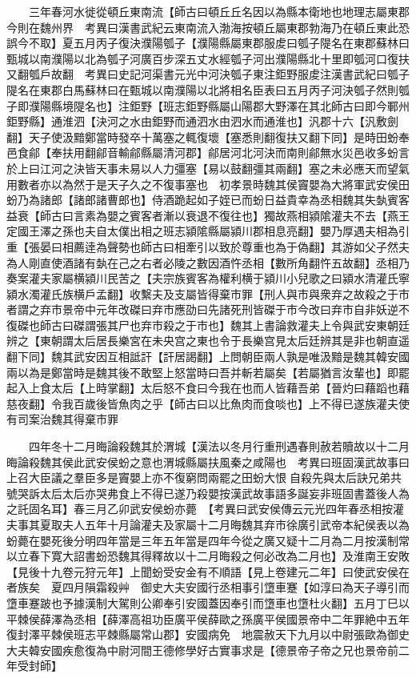 　　三年春河水徙從頓丘東南流【師古曰頓丘丘名因以為縣本衛地也地理志屬東郡今則在魏州界　考異曰漢書武紀云東南流入渤海按頓丘屬東郡勃海乃在頓丘東此恐誤今不取】夏五月丙子復決濮陽瓠子【濮陽縣屬東郡服䖍曰瓠子隄名在東郡蘇林曰甄城以南濮陽以北為瓠子河廣百步深五丈水經瓠子河出濮陽縣北十里即瓠河口復扶又翻瓠戶故翻　考異曰史記河渠書元光中河決瓠子東注鉅野服䖍注漢書武紀曰瓠子隄名在東郡白馬蘇林曰在甄城以南濮陽以北將相名臣表曰五月丙子河決瓠子然則瓠子即濮陽縣境隄名也】注鉅野【班志鉅野縣屬山陽郡大野澤在其北師古曰即今鄆州鉅野縣】通淮泗【決河之水由鉅野而通泗水由泗水而通淮也】汎郡十六【汎敷劍翻】天子使汲黯鄭當時發卒十萬塞之輒復壞【塞悉則翻復扶又翻下同】是時田蚡奉邑食鄃【奉扶用翻鄃音輸鄃縣屬清河郡】鄃居河北河決而南則鄃無水災邑收多蚡言於上曰江河之決皆天事未易以人力彊塞【易以鼓翻彊其兩翻】塞之未必應天而望氣用數者亦以為然于是天子久之不復事塞也　初孝景時魏其侯竇嬰為大將軍武安侯田蚡乃為諸郎【諸郎諸曹郎也】侍酒跪起如子姪已而蚡日益貴幸為丞相魏其失埶賓客益衰【師古曰言素為嬰之賓客者漸以衰退不復往也】獨故燕相潁隂灌夫不去【燕王定國王澤之孫也夫自太僕出相之班志潁隂縣屬潁川郡相息亮翻】嬰乃厚遇夫相為引重【張晏曰相薦逹為聲勢也師古曰相牽引以致於尊重也為于偽翻】其游如父子然夫為人剛直使酒諸有埶在己之右者必陵之數因酒忤丞相【數所角翻忤五故翻】丞相乃奏案灌夫家屬横潁川民苦之【夫宗族賓客為權利横于潁川小兒歌之曰潁水清灌氏寧潁水濁灌氏族横戶孟翻】收繫夫及支屬皆得棄市罪【刑人與市與衆弃之故殺之于市者謂之弃市景帝中元年改磔曰弃市應劭曰先諸死刑皆磔于市今改曰弃市自非妖逆不復磔也師古曰磔謂張其尸也弃市殺之于市也】魏其上書論救灌夫上令與武安東朝廷辨之【東朝謂太后居長樂宮在未央宫之東也令于長樂宫見太后廷辨其是非也朝直遥翻下同】魏其武安因互相詆訐【訐居謁翻】上問朝臣兩人孰是唯汲黯是魏其韓安國兩以為是鄭當時是魏其後不敢堅上怒當時曰吾并斬若屬矣【若屬猶言汝輩也】即罷起入上食太后【上時掌翻】太后怒不食曰今我在也而人皆藉吾弟【晉灼曰藉蹈也藉慈夜翻】令我百歲後皆魚肉之乎【師古曰以比魚肉而食啖也】上不得已遂族灌夫使有司案治魏其得棄市罪

　　四年冬十二月晦論殺魏其於渭城【漢法以冬月行重刑遇春則赦若贖故以十二月晦論殺魏其侯此武安侯蚡之意也渭城縣屬扶風秦之咸陽也　考異曰班固漢武故事曰上召大臣議之羣臣多是竇嬰上亦不復窮問兩罷之田蚡大恨自殺先與太后訣兄弟共號哭訴太后太后亦哭弗食上不得已遂乃殺嬰按漢武故事語多誕妄非班固書蓋後人為之託固名耳】春三月乙卯武安侯蚡亦薨　【考異曰武安侯傳云元光四年春丞相按灌夫事其夏取夫人五年十月論灌夫及家屬十二月晦魏其弃市徐廣引武帝本紀侯表以為蚡薨在嬰死後分明四年當是三年五年當是四年今從之廣又疑十二月為二月按漢制常以立春下寛大詔書蚡恐魏其得釋故以十二月晦殺之何必改為二月也】及淮南王安敗【見後十九卷元狩元年】上聞蚡受安金有不順語【見上卷建元二年】曰使武安侯在者族矣　夏四月隕霜殺艸　御史大夫安國行丞相事引墯車蹇【如淳曰為天子導引而墯車蹇跛也予據漢制大駕則公卿奉引安國蓋因奉引而墯車也墯杜火翻】五月丁巳以平棘侯薛澤為丞相【薛澤高祖功臣廣平侯薛歐之孫廣平侯國景帝中二年罪絶中五年復封澤平棘侯班志平棘縣屬常山郡】安國病免　地震赦天下九月以中尉張歐為御史大夫韓安國疾愈復為中尉河間王德修學好古實事求是【德景帝子帝之兄也景帝前二年受封師】

